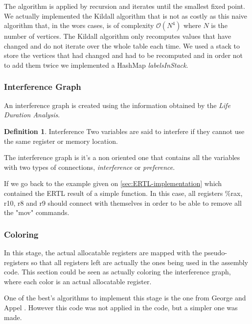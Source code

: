 \documentclass[conference]{IEEEtran}
\theoremstyle{definition}
\newtheorem{definition}{Definition}[section]
\begin{document}
The algorithm is applied by recursion and iterates until the smallest fixed point. We actually implemented the Kildall algorithm that is not as costly as this naive algorithm that, in the wors cases, is of complexity $\mathcal{O}(N^4)$ where $N$ is the number of vertices. The Kildall algorithm only recomputes values that have changed and do not iterate over the whole table each time. We used a stack to store the vertices that had changed and had to be recomputed and in order not to add them twice we implemented a HashMap \textit{labelsInStack}.

\subsubsection{Interference Graph}

An interference graph is created using the information obtained by the \textit{Life Duration Analysis}.

\theoremstyle{definition}
\begin{definition}{Interference}
	Two variables are said to interfere if they cannot use the same register or memory location.
\end{definition}

The interference graph is it's a non oriented one that contains all the variables with two types of connections, \textit{interference} or \textit{preference}.

If we go back to the example given on \ref{sec:ERTL-implementation} which contained the ERTL result of a simple function. In this case, all registers \%rax, r10, r8 and r9 should connect with themselves in order to be able to remove all the "mov" commands.

\subsubsection{Coloring} \label{sec:coloring}

In this stage, the actual allocatable registers are mapped with the pseudo-registers so that all registers left are actually the ones being used in the assembly code. This section could be seen as actually coloring the interference graph, where each color is an actual allocatable register.

One of the best's algorithms to implement this stage is the one from George and Appel \cite{COLORING}. However this code was not applied in the code, but a simpler one was made.
\end{document}
